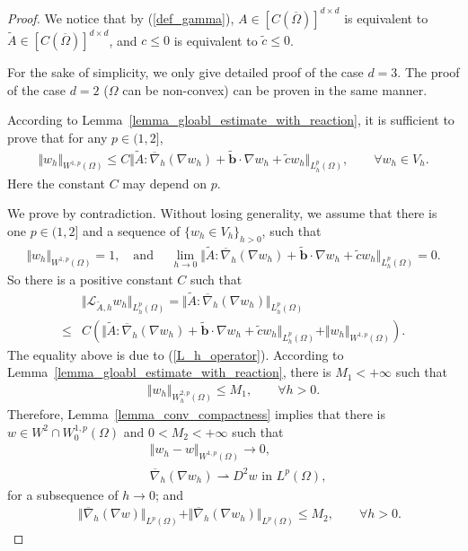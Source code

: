 \documentclass[12pt]{amsart}
\theoremstyle{definition}
\theoremstyle{remark}
\begin{document}
\begin{proof}
We notice that by (\ref{def_gamma}), $A \in [C(\overline{\Omega})]^{d\times d}$ is equivalent 
to $\tilde{A} \in [C(\overline{\Omega})]^{d\times d}$, and $c \leq 0$ is 
equivalent to $\tilde{c} \leq 0$. 

For the sake of simplicity, we only give detailed proof of the case $d=3$. The proof of the case $d=2$ ($\Omega$ 
can be non-convex) can be proven in the same manner.

According to Lemma~\ref{lemma_gloabl_estimate_with_reaction}, it is sufficient to prove that for any $p \in (1, 2]$,
\begin{align*}
\Vert w_{h}\Vert_{W^{1,p}(\Omega)} \leq C \Vert \tilde{A}: \overline{\nabla}_{h}(\nabla w_{h})
+\tilde{\boldsymbol{b}}\cdot\nabla w_{h} + \tilde{c} w_{h}  \Vert_{L_{h}^{p}(\Omega)}, 
\qquad \forall w_{h} \in V_{h}.
\end{align*}
Here the constant $C$ may depend on $p$. 

We prove by contradiction. Without losing generality, we assume that there is one $p \in (1, 2]$ and 
a sequence of $\{w_{h} \in V_{h}\}_{h>0}$, such that 
\begin{align}
\label{assumption_contradition1}
\Vert w_{h}\Vert_{W^{1,p}(\Omega)} = 1, \quad \text{and } \quad  
\lim_{h\rightarrow 0}\Vert \tilde{A}: \overline{\nabla}_{h}(\nabla w_{h})
+\tilde{\boldsymbol{b}}\cdot\nabla w_{h} 
+ \tilde{c}w_{h}\Vert_{L_{h}^{p}(\Omega)} = 0.
\end{align} 
So there is a positive constant $C$ such that 
\begin{align*}
& \Vert \mathcal{L}_{\tilde{A},h}w_{h} \Vert_{L_{h}^{p}(\Omega)} 
= \Vert \tilde{A}: \overline{\nabla}_{h}(\nabla w_{h})\Vert_{L_{h}^{p}(\Omega)} \\
\leq & C \left( \Vert \tilde{A}: \overline{\nabla}_{h}(\nabla w_{h})
+\tilde{\boldsymbol{b}}\cdot\nabla w_{h} + \tilde{c}w_{h}\Vert_{L_{h}^{p}(\Omega)}
+  \Vert w_{h} \Vert_{W^{1,p}(\Omega)} \right).
\end{align*}
The equality above is due to (\ref{L_h_operator}). 
According to Lemma~\ref{lemma_gloabl_estimate_with_reaction}, there is $M_{1} < +\infty$ such that 
\begin{align*}
\Vert w_{h} \Vert_{W_{h}^{2,p}(\Omega)} \leq M_{1}, \qquad \forall h>0.
\end{align*}
Therefore, Lemma~\ref{lemma_conv_compactness} implies that 
there is $w \in W^{2} \cap W_{0}^{1,p}(\Omega)$ and $ 0<M_{2}< + \infty$ 
such that 
\begin{align}
\label{conv_w_second_order_proof}
& \Vert w_{h} - w\Vert_{W^{1,p}(\Omega)} \rightarrow 0, \\
\label{conv_w_second_order_weak_proof} 
& \overline{\nabla}_{h}(\nabla w_{h}) \rightharpoonup D^{2}w \text{ in } 
L^{p}(\Omega),
\end{align}
for a subsequence of $h \rightarrow 0$; and 
\begin{align}
\label{discrete_second_deri_bound_proof}
\quad \Vert \overline{\nabla}_{h}(\nabla w) \Vert_{L^{p}(\Omega)} 
+ \Vert \overline{\nabla}_{h} (\nabla w_{h})\Vert_{L^{p}(\Omega)} 
\leq M_{2}, \qquad \forall h> 0.
\end{align}


\end{proof}
\end{document}
